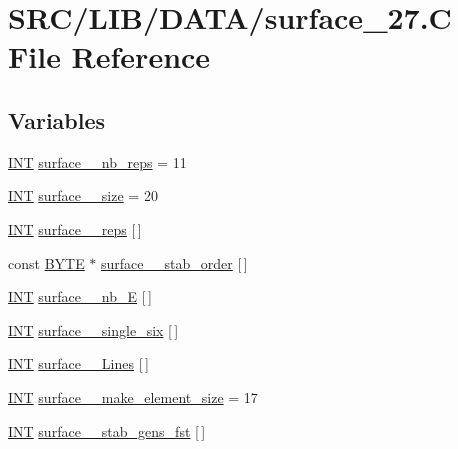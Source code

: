 \hypertarget{surface__27_8_c}{}\section{S\+R\+C/\+L\+I\+B/\+D\+A\+T\+A/surface\+\_\+27.C File Reference}
\label{surface__27_8_c}
\subsection*{Variables}
\begin{DoxyCompactItemize}
\item 
\mbox{\hyperlink{galois_8h_a09fddde158a3a20bd2dcadb609de11dc}{I\+NT}} \mbox{\hyperlink{surface__27_8_c_a4c292bee45ce7cd8f9ea56c6d2972b70}{surface\+\_\+\_\+nb\+\_\+reps}} = 11
\item 
\mbox{\hyperlink{galois_8h_a09fddde158a3a20bd2dcadb609de11dc}{I\+NT}} \mbox{\hyperlink{surface__27_8_c_aaab76b3a0d22a0cd5ff0ea75086a3d36}{surface\+\_\+\_\+size}} = 20
\item 
\mbox{\hyperlink{galois_8h_a09fddde158a3a20bd2dcadb609de11dc}{I\+NT}} \mbox{\hyperlink{surface__27_8_c_afb541ccc6c9f4e04ca743c72bad20dc2}{surface\+\_\+\_\+reps}} \mbox{[}$\,$\mbox{]}
\item 
const \mbox{\hyperlink{galois_8h_ab6cc7b4aeb6ea31aba2b3fbfc83ff5e6}{B\+Y\+TE}} $\ast$ \mbox{\hyperlink{surface__27_8_c_a6e902798892e70e95c3bf8158a4dd067}{surface\+\_\+\_\+stab\+\_\+order}} \mbox{[}$\,$\mbox{]}
\item 
\mbox{\hyperlink{galois_8h_a09fddde158a3a20bd2dcadb609de11dc}{I\+NT}} \mbox{\hyperlink{surface__27_8_c_af9ff07ebc8e2615727bdaed0ac8a7a29}{surface\+\_\+\_\+nb\+\_\+E}} \mbox{[}$\,$\mbox{]}
\item 
\mbox{\hyperlink{galois_8h_a09fddde158a3a20bd2dcadb609de11dc}{I\+NT}} \mbox{\hyperlink{surface__27_8_c_a09501ffc959259396efff23369b69614}{surface\+\_\+\_\+single\+\_\+six}} \mbox{[}$\,$\mbox{]}
\item 
\mbox{\hyperlink{galois_8h_a09fddde158a3a20bd2dcadb609de11dc}{I\+NT}} \mbox{\hyperlink{surface__27_8_c_aaaf06d5fa86295235c287bb74c3e23ae}{surface\+\_\+\_\+\+Lines}} \mbox{[}$\,$\mbox{]}
\item 
\mbox{\hyperlink{galois_8h_a09fddde158a3a20bd2dcadb609de11dc}{I\+NT}} \mbox{\hyperlink{surface__27_8_c_a0e5bb03ae172c52c2a86ca0b8be9281a}{surface\+\_\+\_\+make\+\_\+element\+\_\+size}} = 17
\item 
\mbox{\hyperlink{galois_8h_a09fddde158a3a20bd2dcadb609de11dc}{I\+NT}} \mbox{\hyperlink{surface__27_8_c_aec49000ae88617cad7b21bb45c2d2186}{surface\+\_\+\_\+stab\+\_\+gens\+\_\+fst}} \mbox{[}$\,$\mbox{]}

\end{DoxyCompactItemize}
